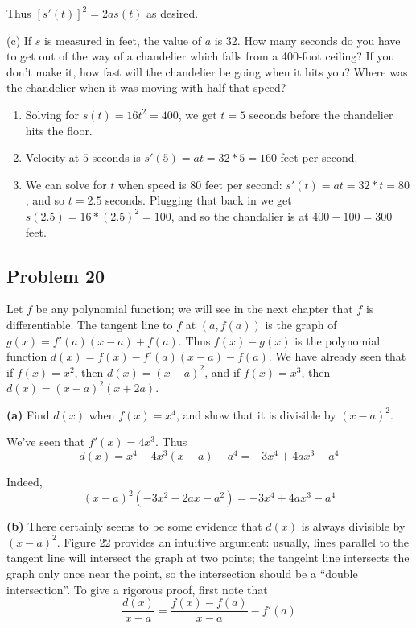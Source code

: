 Thus $[s'(t)]^2=2as(t)$ as desired.

\vs

(c) If $s$ is measured in feet, the value of $a$ is 32. How many
seconds do you have to get out of the way of a chandelier which falls
from a 400-foot ceiling? If you don't make it, how fast will the
chandelier be going when it hits you? Where was the chandelier when it
was moving with half that speed?

\begin{enumerate}
\item Solving for $s(t)=16t^2=400$, we get $t=5$ seconds before the
  chandelier hits the floor.
\item Velocity at $5$ seconds is $s'(5)=at=32*5=160$ feet per second.
\item We can solve for $t$ when speed is $80$ feet per second:
  $s'(t)=at=32*t=80$, and so $t=2.5$ seconds. Plugging that back in we
  get $s(2.5)=16*(2.5)^2=100$, and so the chandalier is at
  $400-100=300$ feet.
\end{enumerate}

\subsection*{Problem 20}
Let $f$ be any polynomial function; we will see in the next chapter
that $f$ is differentiable. The tangent line to $f$ at $(a, f(a))$ is
the graph of $g(x)=f'(a)(x-a)+f(a)$. Thus $f(x)-g(x)$ is the
polynomial function $d(x)=f(x)-f'(a)(x-a)-f(a)$. We have already seen
that if $f(x)=x^2$, then $d(x)=(x-a)^2$, and if $f(x)=x^3$, then
$d(x)=(x-a)^2(x+2a)$.

\vs

\textbf{(a)} Find $d(x)$ when $f(x)=x^{4}$, and show that it is
divisible by $(x-a)^2$.

\vs

We've seen that $f'(x)=4x^3$. Thus
\[d(x)=x^4-4x^3(x-a)-a^4=-3x^4+4ax^3-a^4\]

Indeed,
\[(x-a)^2(-3x^2-2ax-a^2)=-3x^4+4ax^3-a^4\]

\textbf{(b)} There certainly seems to be some evidence that $d(x)$ is
always divisible by $(x-a)^2$. Figure 22 provides an intuitive
argument: usually, lines parallel to the tangent line will intersect
the graph at two points; the tangelnt line intersects the graph only
once near the point, so the intersection should be a ``double
intersection''. To give a rigorous proof, first note that
\[\frac{d(x)}{x-a}=\frac{f(x)-f(a)}{x-a}-f'(a)\]


